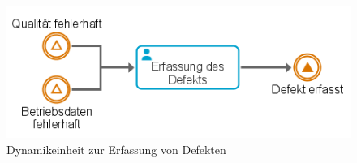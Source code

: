 \begin{figure}[H]
	\centering 
    \includegraphics[width=.7\textwidth]{img/defectiit.png}	
    \caption[Dynamikeinheit zur Erfassung von Defekten]
    {Dynamikeinheit zur Erfassung von Defekten\protect\footnotemark}
    \label{fig:Dynamikeinheit zur Erfassung von Defekten}
\end{figure}



